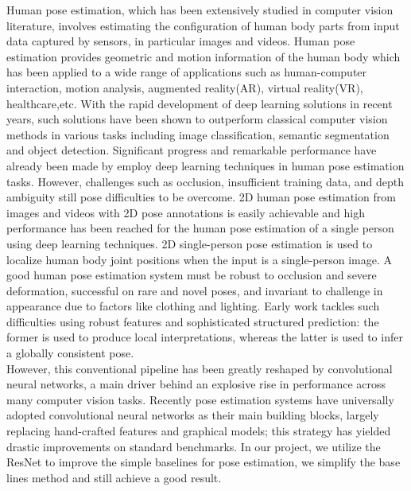 \documentclass[final]{cvpr}
\begin{document}
Human pose estimation, which has been extensively studied in computer vision literature, involves estimating the configuration of human body parts from input data captured by sensors, in particular images and videos. Human pose estimation provides geometric and motion information of the human body which has been applied to a wide range of applications such as human-computer interaction, motion analysis, augmented reality(AR), virtual reality(VR), healthcare,etc. With the rapid development of deep learning solutions in recent years, such solutions have been shown to outperform classical computer vision methods in various tasks including image classification, semantic segmentation and object detection. Significant progress and remarkable performance have already been made by employ deep learning techniques in human pose estimation tasks. However, challenges such as occlusion, insufficient training data, and depth ambiguity still pose difficulties to be overcome. 2D human pose estimation from images and videos with 2D pose annotations is easily achievable and high performance has been reached for the human pose estimation of a single person using deep learning techniques. 2D single-person pose estimation is used to localize human body joint positions when the input is a single-person image. A good human pose estimation system must be robust to occlusion and severe deformation, successful on rare and novel poses, and invariant to challenge in appearance due to factors like clothing and lighting. Early work tackles such difficulties using robust features and sophisticated structured prediction: the former is used to produce local interpretations, whereas the latter is used to infer a globally consistent pose.\\
\indent However, this conventional pipeline has been greatly reshaped by convolutional neural networks\cite{lecun1998gradient}, a main driver behind an explosive rise in performance across many computer vision tasks. Recently pose estimation\cite{tompson2014joint} systems have universally adopted convolutional neural networks as their main building blocks, largely replacing hand-crafted features and graphical models; this strategy has yielded drastic improvements on standard benchmarks. In our project, we utilize the ResNet\cite{he2016deep} to improve the simple baselines for pose estimation\cite{xiao2018simple}, we simplify the base lines method and still achieve a good result.
\end{document}
